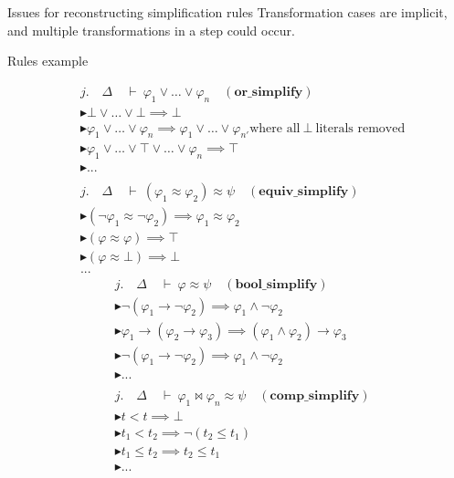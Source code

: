 \documentclass[aspectratio=169,xcolor={dvipsnames}]{beamer}
\begin{document}
\begin{frame}{Issues for reconstructing simplification rules}
    Transformation cases are implicit, and multiple transformations in a step could occur.
    \begin{block}{Rules example}

\begin{multicols}{2}
{\tiny
\begin{align*}
& j.\quad \Delta \quad \vdash~ \varphi_1 \lor \dots \lor \varphi_n \quad (\textbf{or\_simplify}) \\
& \blacktriangleright \bot \lor \dots \lor \bot \implies \bot \\
& \blacktriangleright \varphi_1 \lor \dots \lor \varphi_n \implies \varphi_1 \lor \dots \lor \varphi_{n'} \text{where all} ~\bot~ \text{literals removed}\\
& \blacktriangleright \varphi_1 \lor \dots \lor \top \lor \dots \lor \varphi_n \implies \top \\
& \blacktriangleright ... \\
& \\
& j.\quad \Delta \quad \vdash~ (\varphi_1 \approx \varphi_2) \approx \psi \quad (\textbf{equiv\_simplify}) \\
& \blacktriangleright (\neg \varphi_1 \approx \neg \varphi_2) \implies \varphi_1 \approx \varphi_2 \\
& \blacktriangleright (\varphi \approx \varphi) \implies \top \\
& \blacktriangleright (\varphi \approx \bot) \implies \bot \\
& ...
\end{align*}
\begin{align*}
& j.\quad \Delta \quad \vdash~ \varphi \approx \psi \quad (\textbf{bool\_simplify}) \\
& \blacktriangleright \neg (\varphi_1 \rightarrow \neg \varphi_2) \implies  \varphi_1 \land \neg \varphi_2  \\
& \blacktriangleright \varphi_1 \rightarrow (\varphi_2 \rightarrow \varphi_3) \implies  (\varphi_1 \land \varphi_2) \rightarrow \varphi_3 \\
& \blacktriangleright \neg (\varphi_1 \rightarrow \neg \varphi_2) \implies  \varphi_1 \land \neg \varphi_2  \\
& \blacktriangleright ... \\
& \\
& j.\quad \Delta \quad \vdash~ \varphi_1 \bowtie \varphi_n \approx \psi \quad (\textbf{comp\_simplify}) \\
& \blacktriangleright t < t \implies \bot \\
& \blacktriangleright t_1 < t_2 \implies \neg (t_2 \leq t_1) \\
& \blacktriangleright t_1 \leq t_2 \implies t_2 \leq t_1 \\
& \blacktriangleright ...
\end{align*}
}%
\end{multicols}
\end{block}
\end{frame}
\end{document}
